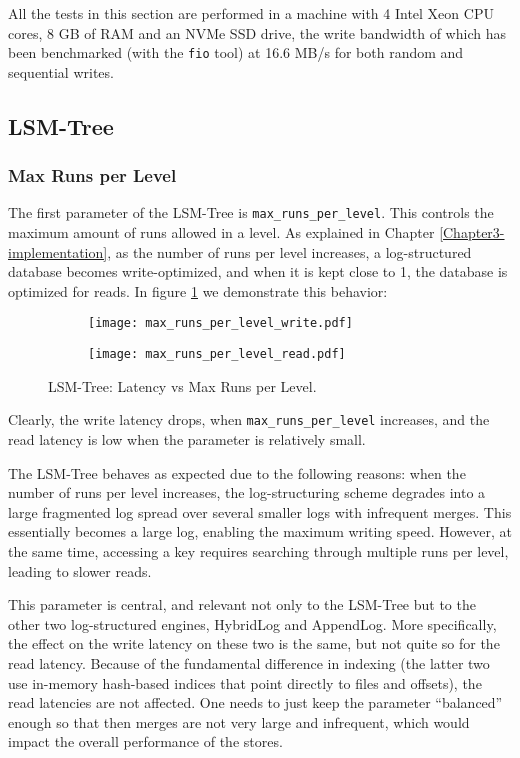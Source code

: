 All the tests in this section are performed in a machine with 4 Intel Xeon CPU cores, 8 GB of RAM and an NVMe SSD drive, the write bandwidth of which has been benchmarked (with the \verb|fio| tool) at 16.6 MB/s for both random and sequential writes.

\subsection{LSM-Tree}

\subsubsection{Max Runs per Level}

The first parameter of the LSM-Tree is \verb"max_runs_per_level". This controls the maximum amount of runs allowed in a level. As explained in Chapter \ref{Chapter3-implementation}, as the number of runs per level increases, a log-structured database becomes write-optimized, and when it is kept close to 1, the database is optimized for reads. In figure \ref{fig:max-runs-per-level} we demonstrate this behavior:

\begin{figure}[h]
    \begin{subfigure}{.5\textwidth}
        \centering
        \texttt{[image: max\_runs\_per\_level\_write.pdf]}
    \end{subfigure}
    \begin{subfigure}{.5\textwidth}
        \centering
        \texttt{[image: max\_runs\_per\_level\_read.pdf]}
    \end{subfigure}
    \caption{LSM-Tree: Latency vs Max Runs per Level.}
    \label{fig:max-runs-per-level}
\end{figure}

Clearly, the write latency drops, when \verb"max_runs_per_level" increases, and the read latency is low when the parameter is relatively small.

The LSM-Tree behaves as expected due to the following reasons: when the number of runs per level increases, the log-structuring scheme degrades into a large fragmented log spread over several smaller logs with infrequent merges. This essentially becomes a large log, enabling the maximum writing speed. However, at the same time, accessing a key requires searching through multiple runs per level, leading to slower reads.

This parameter is central, and relevant not only to the LSM-Tree but to the other two log-structured engines, HybridLog and AppendLog. More specifically, the effect on the write latency on these two is the same, but not quite so for the read latency. Because of the fundamental difference in indexing (the latter two use in-memory hash-based indices that point directly to files and offsets), the read latencies are not affected. One needs to just keep the parameter ``balanced'' enough so that then merges are not very large and infrequent, which would impact the overall performance of the stores.

